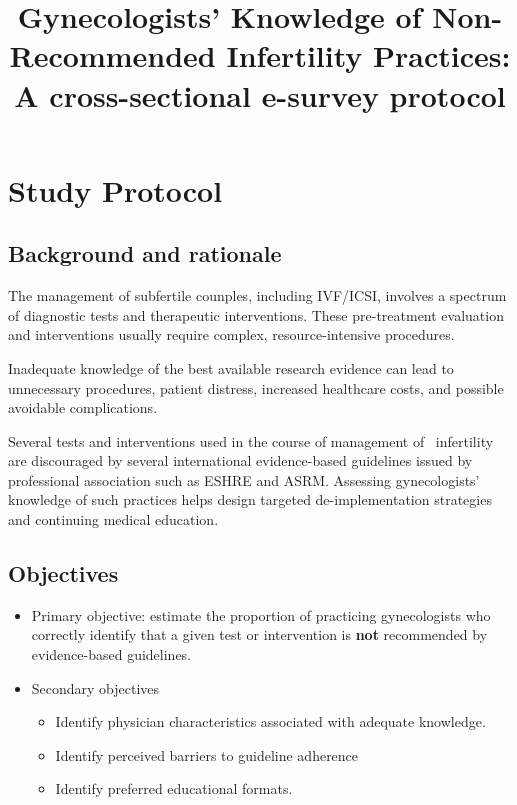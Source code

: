 \documentclass[
  letterpaper,
  DIV=11,
  numbers=noendperiod]{scrartcl}
\title{Gynecologists' Knowledge of Non-Recommended Infertility
Practices: A cross-sectional e-survey protocol}
\author{}
\date{}
\begin{document}
\maketitle


\section{Study Protocol}\label{study-protocol}

\subsection{Background and rationale}\label{background-and-rationale}

The management of subfertile counples, including IVF/ICSI, involves a
spectrum of diagnostic tests and therapeutic interventions. These
pre-treatment evaluation and interventions usually require complex,
resource-intensive procedures.

Inadequate knowledge of the best available research evidence can lead to
unnecessary procedures, patient distress, increased healthcare costs,
and possible avoidable complications.

Several tests and interventions used in the course of management of
~infertility are discouraged by several international evidence-based
guidelines issued by professional association such as ESHRE and ASRM.
Assessing gynecologists' knowledge of such practices helps design
targeted de-implementation strategies and continuing medical education.

\subsection{Objectives}\label{objectives}

\begin{itemize}
\item
  Primary objective: estimate the proportion of practicing gynecologists
  who correctly identify that a given test or intervention is
  \textbf{not} recommended by evidence-based guidelines.
\item
  Secondary objectives

  \begin{itemize}
  \item
    Identify physician characteristics associated with adequate
    knowledge.
  \item
    Identify perceived barriers to guideline adherence
  \item
    Identify preferred educational formats.
  \end{itemize}
\end{itemize}
\end{document}
